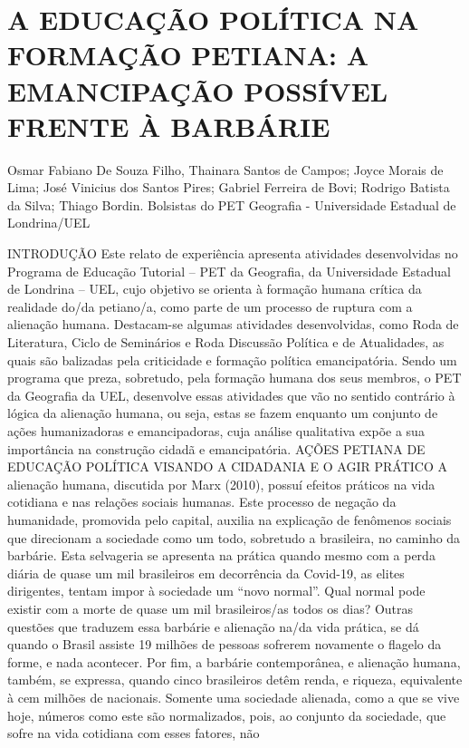 \section{A EDUCAÇÃO POLÍTICA NA FORMAÇÃO PETIANA: A EMANCIPAÇÃO POSSÍVEL FRENTE À BARBÁRIE}

Osmar Fabiano De Souza Filho, Thainara Santos de Campos; Joyce Morais de Lima; José Vinicius dos Santos Pires;  Gabriel Ferreira de Bovi; Rodrigo Batista da Silva; Thiago Bordin.  Bolsistas do PET Geografia - Universidade Estadual de Londrina/UEL

INTRODUÇÃO
Este relato de experiência apresenta atividades desenvolvidas no Programa de Educação 
Tutorial – PET da Geografia, da Universidade Estadual de Londrina – UEL, cujo objetivo se
orienta à formação humana crítica da realidade do/da petiano/a, como parte de um processo de 
ruptura com a alienação humana. Destacam-se algumas atividades desenvolvidas, como Roda de 
Literatura, Ciclo de Seminários e Roda Discussão Política e de Atualidades, as quais são balizadas 
pela criticidade e formação política emancipatória. Sendo um programa que preza, sobretudo, pela 
formação humana dos seus membros, o PET da Geografia da UEL, desenvolve essas atividades 
que vão no sentido contrário à lógica da alienação humana, ou seja, estas se fazem enquanto um 
conjunto de ações humanizadoras e emancipadoras, cuja análise qualitativa expõe a sua
importância na construção cidadã e emancipatória.
AÇÕES PETIANA DE EDUCAÇÃO POLÍTICA VISANDO A CIDADANIA E O AGIR 
PRÁTICO 
A alienação humana, discutida por Marx (2010), possuí efeitos práticos na vida cotidiana 
e nas relações sociais humanas. Este processo de negação da humanidade, promovida pelo capital, 
auxilia na explicação de fenômenos sociais que direcionam a sociedade como um todo, sobretudo 
a brasileira, no caminho da barbárie. Esta selvageria se apresenta na prática quando mesmo com a 
perda diária de quase um mil brasileiros em decorrência da Covid-19, as elites dirigentes, tentam 
impor à sociedade um “novo normal”. Qual normal pode existir com a morte de quase um mil 
brasileiros/as todos os dias? Outras questões que traduzem essa barbárie e alienação na/da vida 
prática, se dá quando o Brasil assiste 19 milhões de pessoas sofrerem novamente o flagelo da 
forme, e nada acontecer. Por fim, a barbárie contemporânea, e alienação humana, também, se 
expressa, quando cinco brasileiros detêm renda, e riqueza, equivalente à cem milhões de nacionais. 
Somente uma sociedade alienada, como a que se vive hoje, números como este são 
normalizados, pois, ao conjunto da sociedade, que sofre na vida cotidiana com esses fatores, não 
